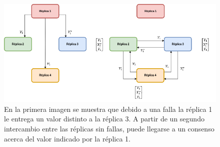 

\begin{figure}[H]
    \centering
    \includegraphics[width=\textwidth]{img/byzantine_ejemplo_3.png}
    \caption{En la primera imagen se muestra que debido a una falla la réplica 1 le entrega un valor distinto a la réplica 3. A partir de un segundo intercambio entre las réplicas sin fallas, puede llegarse a un consenso acerca del valor indicado por la réplica 1.}
    \label{fig:byzantine_ejemplo_3}
\end{figure}


